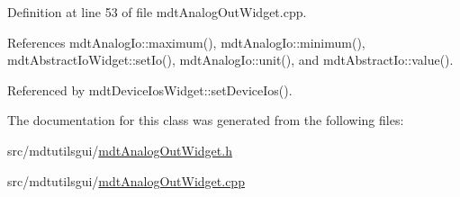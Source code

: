 Definition at line 53 of file mdt\-Analog\-Out\-Widget.\-cpp.



References mdt\-Analog\-Io\-::maximum(), mdt\-Analog\-Io\-::minimum(), mdt\-Abstract\-Io\-Widget\-::set\-Io(), mdt\-Analog\-Io\-::unit(), and mdt\-Abstract\-Io\-::value().



Referenced by mdt\-Device\-Ios\-Widget\-::set\-Device\-Ios().



The documentation for this class was generated from the following files\-:\begin{DoxyCompactItemize}
\item 
src/mdtutilsgui/\hyperlink{mdt_analog_out_widget_8h}{mdt\-Analog\-Out\-Widget.\-h}\item 
src/mdtutilsgui/\hyperlink{mdt_analog_out_widget_8cpp}{mdt\-Analog\-Out\-Widget.\-cpp}\end{DoxyCompactItemize}

